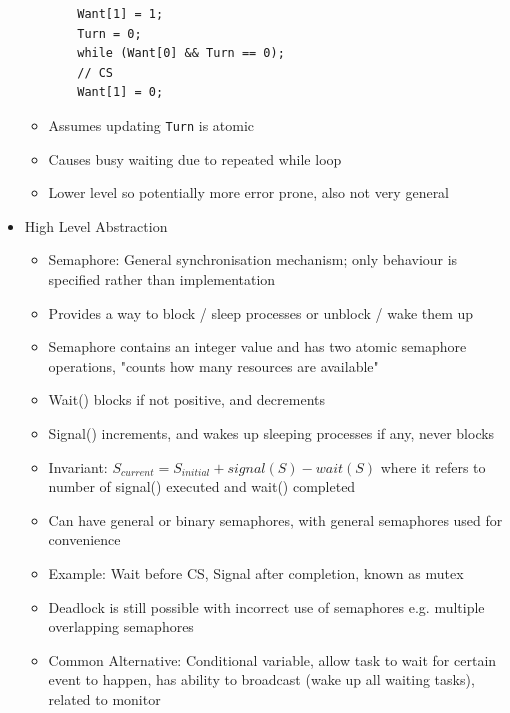 \documentclass[10pt, landscape]{article}
\begin{document}
\begin{multicols*}{3}
\begin{itemize}
\begin{itemize}
\begin{verbatim}
    Want[1] = 1;
    Turn = 0;
    while (Want[0] && Turn == 0);
    // CS
    Want[1] = 0;
        \end{verbatim}
        \item Assumes updating \verb|Turn| is atomic
        \item Causes busy waiting due to repeated while loop
        \item Lower level so potentially more error prone, also not very general
    \end{itemize}
    \item High Level Abstraction
    \begin{itemize}
        \item Semaphore: General synchronisation mechanism; only behaviour is specified rather than implementation
        \item Provides a way to block / sleep processes or unblock / wake them up
        \item Semaphore contains an integer value and has two atomic semaphore operations, "counts how many resources are available"
        \item Wait() blocks if not positive, and decrements
        \item Signal() increments, and wakes up sleeping processes if any, never blocks
        \item Invariant: $S_{current}=S_{initial}+signal(S)-wait(S)$ where it refers to number of signal() executed and wait() completed
        \item Can have general or binary semaphores, with general semaphores used for convenience
        \item Example: Wait before CS, Signal after completion, known as mutex
        \item Deadlock is still possible with incorrect use of semaphores e.g. multiple overlapping semaphores
        \item Common Alternative: Conditional variable, allow task to wait for certain event to happen, has ability to broadcast (wake up all waiting tasks), related to monitor
    \end{itemize}
\end{itemize}


\end{multicols*}
\end{document}
